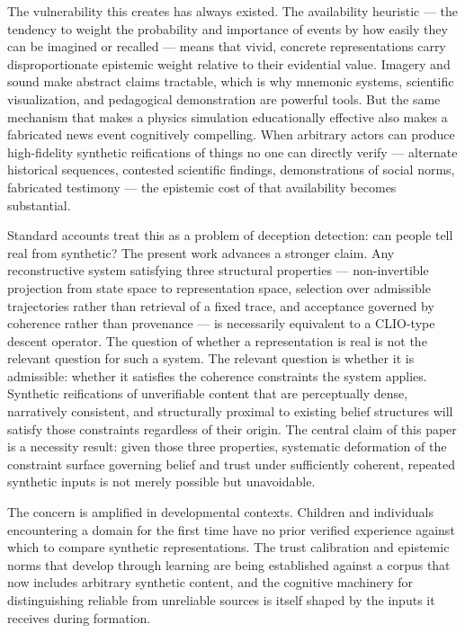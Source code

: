 \documentclass[12pt, a4paper]{article}
\begin{document}
The vulnerability this creates has always existed. The availability heuristic --- the tendency to weight the probability and importance of events by how easily they can be imagined or recalled --- means that vivid, concrete representations carry disproportionate epistemic weight relative to their evidential value. Imagery and sound make abstract claims tractable, which is why mnemonic systems, scientific visualization, and pedagogical demonstration are powerful tools. But the same mechanism that makes a physics simulation educationally effective also makes a fabricated news event cognitively compelling. When arbitrary actors can produce high-fidelity synthetic reifications of things no one can directly verify --- alternate historical sequences, contested scientific findings, demonstrations of social norms, fabricated testimony --- the epistemic cost of that availability becomes substantial.

Standard accounts treat this as a problem of deception detection: can people tell real from synthetic? The present work advances a stronger claim. Any reconstructive system satisfying three structural properties --- non-invertible projection from state space to representation space, selection over admissible trajectories rather than retrieval of a fixed trace, and acceptance governed by coherence rather than provenance --- is necessarily equivalent to a CLIO-type descent operator. The question of whether a representation is real is not the relevant question for such a system. The relevant question is whether it is admissible: whether it satisfies the coherence constraints the system applies. Synthetic reifications of unverifiable content that are perceptually dense, narratively consistent, and structurally proximal to existing belief structures will satisfy those constraints regardless of their origin. The central claim of this paper is a necessity result: given those three properties, systematic deformation of the constraint surface governing belief and trust under sufficiently coherent, repeated synthetic inputs is not merely possible but unavoidable.

The concern is amplified in developmental contexts. Children and individuals encountering a domain for the first time have no prior verified experience against which to compare synthetic representations. The trust calibration and epistemic norms that develop through learning are being established against a corpus that now includes arbitrary synthetic content, and the cognitive machinery for distinguishing reliable from unreliable sources is itself shaped by the inputs it receives during formation.
\end{document}
